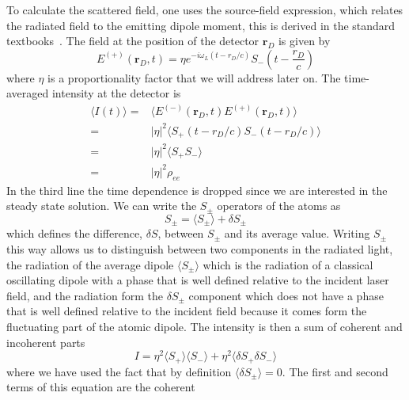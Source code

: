 \documentclass[11pt,letter]{article}
\newcommand{\bv}[1]{\ensuremath{\bm{#1}}}
\begin{document}
To calculate the scattered field, one uses the source-field expression, which
relates the radiated field to the emitting dipole moment, this is derived in
the standard textbooks~\cite{loudon2000quantum,cohen1998atom}.  The field at
the position of the detector $\bv{r}_{D}$ is given by
\begin{equation} 
    E^{(+)}( \bv{r}_{D}, t) = 
    \eta e^{- i \omega_{L} ( t -r_{D}/c) } 
    S_{-}\left(t - \frac{ r_{D} }{c} \right)
    \label{eq:source-field} 
\end{equation} where $\eta$
is a proportionality factor that we will address later on.  The time-averaged
intensity at the detector is 
\begin{equation}
\label{eq:Idef}
\begin{split}
\langle I (t) \rangle = & 
    \langle E^{(-)}(\bv{r}_{D}, t) E^{(+)}(\bv{r}_{D}, t) \rangle \\
   = & |\eta|^{2} \langle S_{+}(t-r_{D}/c)S_{-}(t-r_{D}/c) \rangle  \\
   = & |\eta|^{2} \langle S_{+}S_{-} \rangle \\
   = & |\eta|^{2} \rho_{ee}  
\end{split} 
\end{equation}
In the third line the time dependence is dropped since we are interested in the
steady state solution.  We can write the $S_{\pm}$ operators of the atoms as 
\begin{equation} 
    S_{\pm} = \langle S_{\pm} \rangle + \delta S_{\pm} 
\end{equation}
which defines the difference, $\delta S$, between $S_{\pm}$ and its average
value.   Writing $S_{\pm}$ this way allows us to distinguish between two
components in the radiated light,  the radiation of the average dipole $\langle
S_{\pm}\rangle$ which is the radiation of a classical oscillating dipole with a
phase that is well defined relative to the incident laser field, and the
radiation form the $\delta S_{\pm}$ component which does not have a phase that
is well defined relative to the incident field because it comes form the
fluctuating part of the atomic dipole.  The intensity is then a sum of coherent
and incoherent parts 
\begin{equation} 
I  = \eta^{2} \langle S_{+}\rangle \langle S_{-} \rangle 
   + \eta^{2} \langle \delta S_{+} \delta S_{-} \rangle 
\end{equation}
where we have used the fact that by definition $\langle \delta S_{\pm}
\rangle = 0$. The first and second terms of this equation are the coherent
\end{document}
